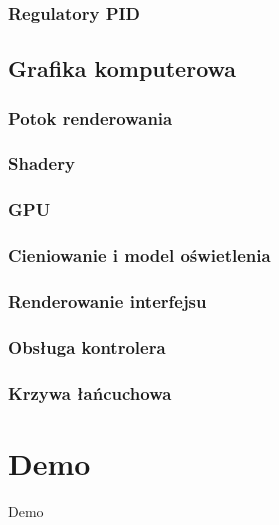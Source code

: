 \documentclass[aspectratio=169]{beamer}
\begin{document}
\begin{frame}[allowframebreaks]
	\frametitle{Regulatory PID}
	
\end{frame}

\subsection{Grafika komputerowa}

\begin{frame}[allowframebreaks]
	\frametitle{Potok renderowania}
	
\end{frame}

\begin{frame}[allowframebreaks]
	\frametitle{Shadery}
	
\end{frame}

\begin{frame}[allowframebreaks]
	\frametitle{GPU}
	
\end{frame}

\begin{frame}[allowframebreaks]
	\frametitle{Cieniowanie i model oświetlenia}
	
\end{frame}

\begin{frame}[allowframebreaks]
	\frametitle{Renderowanie interfejsu}
	
\end{frame}

\begin{frame}[allowframebreaks]
	\frametitle{Obsługa kontrolera}
	
\end{frame}

\begin{frame}[allowframebreaks]
	\frametitle{Krzywa łańcuchowa}
	
\end{frame}

\section{Demo}

\begin{frame}
	  \begin{center}
	\Huge Demo
	\end{center}
\end{frame}
\end{document}
